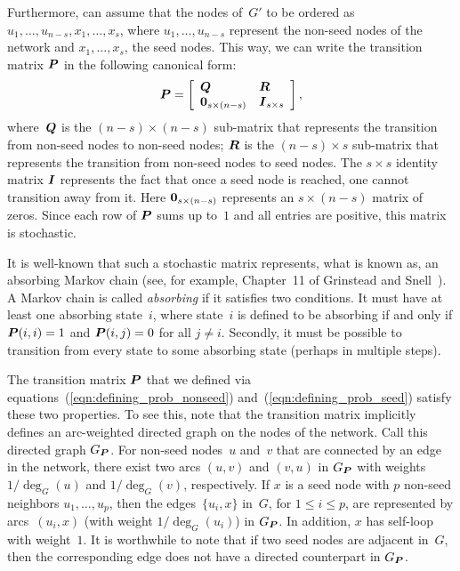 Furthermore, can assume that the nodes of~$G'$ to be ordered as 
$u_1, \ldots, u_{n - s}, x_{1}, \ldots, x_{s}$, where $u_1, \ldots, u_{n - s}$
represent the non-seed nodes of the network and $x_1, \ldots, x_s$, the seed nodes.
This way, we can write the transition matrix $\boldsymbol{P}$ in the following canonical form:
\begin{equation}\label{eqn:canonical_form_P}
	\boldsymbol{P} = 	\left [ \begin{array}{ll}
						\boldsymbol{Q}  & \boldsymbol{R} \\
						 \boldsymbol{0}_{s \times (n - s)} & \boldsymbol{I}_{s \times s}
						\end{array}
				\right ],
\end{equation}
where~$\boldsymbol{Q}$ is the $(n - s) \times (n - s)$ sub-matrix that represents the transition 
from non-seed nodes to non-seed nodes; $\boldsymbol{R}$ is the $(n - s) \times s$ sub-matrix 
that represents the transition from non-seed nodes to seed nodes. The $s \times s$ identity 
matrix $\boldsymbol{I}$ represents the fact that once a seed node is reached, one cannot transition away 
from it. Here $\boldsymbol{0}_{s \times (n - s)}$ represents an $s \times (n - s)$ matrix of zeros. 
Since each row of $\boldsymbol{P}$ sums up to~$1$ and all entries are positive, this matrix is stochastic.

It is well-known that such a stochastic matrix represents, what is known as, an 
absorbing Markov chain (see, for example, Chapter~11 of Grinstead and Snell~\cite{GS98}).  
A Markov chain is called \emph{absorbing} if it satisfies two conditions. 
It must have at least one absorbing state~$i$, where state~$i$ is defined 
to be absorbing if and only if $\boldsymbol{P}(i,i) = 1$ and $\boldsymbol{P}(i, j) = 0$ 
for all $j \neq i$. Secondly, it must be possible to transition from every state to 
    some absorbing state (perhaps in multiple steps). 

The transition matrix $\boldsymbol{P}$ that we defined via equations~(\ref{eqn:defining_prob_nonseed}) 
and~(\ref{eqn:defining_prob_seed}) satisfy these two properties. To see this, note that 
the transition matrix implicitly defines an arc-weighted  directed graph on the nodes 
of the network. Call this directed graph $G_{\boldsymbol{P}}$. For non-seed nodes~$u$ and~$v$ that 
are connected by an edge in the network, there exist two arcs $(u, v)$ and $(v, u)$ 
in $G_{\boldsymbol{P}}$ with weights $1/\deg_G (u)$ and $1/ \deg_G (v)$, respectively.
If $x$ is a seed node with $p$ non-seed neighbors 
$u_1, \ldots, u_p$, then the edges~$\{u_i, x\}$ in~$G$, for $1 \leq i \leq p$, 
are represented by arcs~$(u_i, x)$ (with weight $1 / \deg_G (u_i)$) in $G_{\boldsymbol{P}}$. 
In addition, $x$ has self-loop with weight~$1$. It is worthwhile to note 
that if two seed nodes are adjacent in~$G$, then the corresponding edge does not have a 
directed counterpart in $G_{\boldsymbol{P}}$.  

